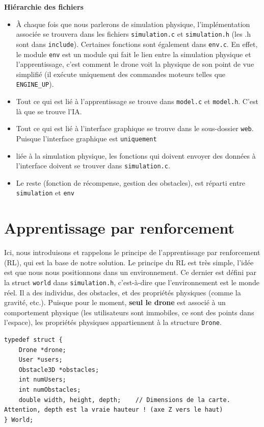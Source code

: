 \documentclass{article}
\begin{document}
\textbf{Hiérarchie des fichiers}
\begin{itemize}
    \item À chaque fois que nous parlerons de simulation physique,
    l'implémentation associée se trouvera dans les fichiers \texttt{simulation.c} et \texttt{simulation.h} (les .h sont dans \texttt{include}). 
    Certaines fonctions sont également dans \texttt{env.c}. En effet, le module \texttt{env} est un module qui fait le lien entre la simulation physique et l'apprentissage,
    c'est comment le drone voit la physique de son point de vue simplifié (il exécute uniquement des commandes moteurs telles que \texttt{ENGINE\_UP}).
    \item Tout ce qui est lié à l'apprentissage se trouve dans \texttt{model.c} et \texttt{model.h}. C'est là que se trouve l'IA.
    \item Tout ce qui est lié à l'interface graphique se trouve dans le sous-dossier \texttt{web}. Puisque l'interface graphique est \texttt{uniquement}
    \item liée à la simulation physique, les fonctions qui doivent envoyer des données à l'interface doivent se trouver dans \texttt{simulation.c}.
    \item Le reste (fonction de récompense, gestion des obstacles), est réparti entre \texttt{simulation} et \texttt{env}
\end{itemize}

\section{Apprentissage par renforcement}

Ici, nous introduisons et rappelons le principe de l'apprentissage par renforcement (RL), qui est la base de notre solution.
Le principe du RL est très simple, l'idée est que nous nous positionnons dans un environnement. 
Ce dernier est défini par la struct \texttt{world} dans \texttt{simulation.h}, c'est-à-dire que l'environnement est le monde réel.
Il a des individus, des obstacles, et des propriétés physiques (comme la gravité, etc.). Puisque pour le moment, \textbf{seul le drone} est associé
à un comportement physique (les utilisateurs sont immobiles, ce sont des points dans l'espace), les propriétés physiques appartiennent à
la structure \texttt{Drone}.

\begin{lstlisting}[style=CStyle]
typedef struct {
    Drone *drone;
    User *users;
    Obstacle3D *obstacles;
    int numUsers;
    int numObstacles;
    double width, height, depth;    // Dimensions de la carte. Attention, depth est la vraie hauteur ! (axe Z vers le haut)
} World;

\end{lstlisting}
\end{document}
